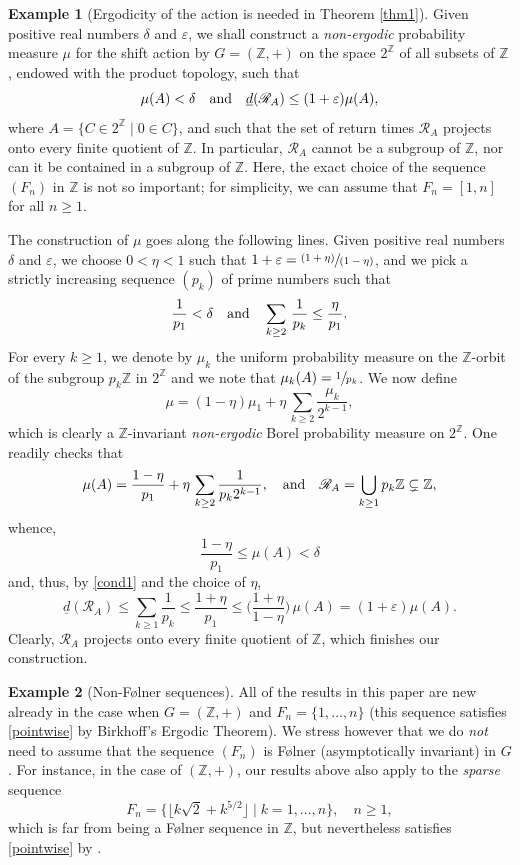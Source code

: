 \documentclass[10pt]{amsart}
\let\mathcal\mathscr
\newcommand{\pspfrac}[2]{\sfrac{(#1)}{(#2)}}
\newcommand{\cR}{\mathcal{R}}
\newcommand{\bZ}{\mathbb{Z}}
\newcommand{\qand}{\quad\textup{and}\quad}
\let\eps\varepsilon
\theoremstyle{plain}
\theoremstyle{definition}
\newtheorem{example}{Example}[section]
\begin{document}
\begin{example}[Ergodicity of the action is needed in Theorem \ref{thm1}]
Given positive real numbers $\delta$ and $\eps$, we shall construct a \emph{non-ergodic} probability measure
$\mu$ for the shift action by $G = (\bZ,+)$ on the space $2^\bZ$ of all subsets of $\bZ$, endowed with the product topology, such that
\[
\mu(A) < \delta \qand \underline{d}(\cR_A) \leq (1+\eps)\mu(A),
\]
where $A = \{ C \in 2^\bZ \mid  0 \in C\}$, and such that the set of return times $\cR_A$ projects onto every finite quotient of $\bZ$. In
particular, $\cR_A$ cannot be a subgroup of $\bZ$, nor can it be contained in a subgroup of $\bZ$.
Here, the exact choice of the sequence $(F_n)$ in $\bZ$ is not so important; for simplicity, we can assume that $F_n = [1,n]$ for all $n \geq 1$.

The construction of $\mu$ goes along the following lines. Given positive real numbers~$\delta$ and $\eps$, we choose $0 < \eta < 1$ such that
$1 + \eps = \pspfrac{1+\eta}{1-\eta}$, and we pick a strictly increasing sequence $(p_k)$ of prime numbers such that
\begin{equation}
\label{cond1}
\frac{1}{p_1} < \delta \qand \sum_{k \geq 2} \, \frac{1}{p_k} \leq \frac{\eta}{p_1}.
\end{equation}
For every $k \geq 1$, we denote by $\mu_k$ the uniform probability measure on the $\bZ$-orbit of the subgroup $p_k \bZ$ in $2^{\bZ}$ and we note
that $\mu_k(A) = \sfrac{1}{p_k}$. We now define
\[
\mu = (1-\eta)\mu_1 + \eta \, \sum_{k \geq 2} \frac{\mu_k}{2^{k-1}},
\]
which is clearly a $\bZ$-invariant \emph{non-ergodic} Borel probability measure on $2^{\bZ}$. One readily checks that
\[
\mu(A) = \frac{1-\eta}{p_1} + \eta \, \sum_{k \geq 2} \frac{1}{p_k 2^{k-1}},
\qand
\cR_A = \bigcup_{k \geq 1} p_k \bZ \subsetneq \bZ,
\]
whence,
\[
\frac{1-\eta}{p_1} \leq \mu(A) < \delta
\]
and, thus, by \eqref{cond1} and the choice of $\eta$,
\[
\underline{d}(\cR_A) \leq \sum_{k \geq 1} \frac{1}{p_k} \leq \frac{1+\eta}{p_1} \leq \Big( \frac{1+\eta}{1-\eta} \Big) \, \mu(A) = (1+\eps)\mu(A).
\]
Clearly, $\cR_A$ projects onto every finite quotient of $\bZ$, which finishes our construction.
\end{example}

\begin{example}[Non-F\o lner sequences]
All of the results in this paper are new already in the case when $G = (\bZ,+)$ and $F_n = \{1,\ldots,n\}$ (this sequence satisfies \eqref{pointwise} by Birkhoff's Ergodic Theorem). We stress however that
we do \emph{not} need to assume that the sequence $(F_n)$ is F\o lner (asymptotically invariant) in $G$. For instance, in the case of $(\bZ,+)$, our results above also apply to the \emph{sparse} sequence
\[
F_n = \bigl\{ \lfloor k \sqrt{2} + k^{5/2} \rfloor \mid  k = 1,\ldots,n \bigr\}, \quad \textrm{$n \geq 1$},
\]
which is far from being a F\o lner sequence in $\bZ$, but nevertheless satisfies \eqref{pointwise} by \cite{BW}.
\end{example}
\end{document}
